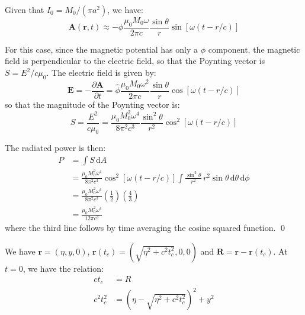 \documentclass[12pt]{article}
\begin{document}
Given that $I_{0} = M_{0}/(\pi a^{2})$, we have:
\begin{equation}
    \mathbf{A}(\mathbf{r}, t) \approx -\hat{\phi} \frac{\mu_{0} M_{0} \omega}{2\pi c} \frac{\sin{\theta}}{r} \sin{\left[ \omega (t - r/c) \right]}
\end{equation}

For this case, since the magnetic potential has only a $\phi$ component, the magnetic field is perpendicular to the electric field, so that the Poynting vector is $S = E^{2}/c\mu_{0}$. The electric field is given by:
\begin{equation}
    \mathbf{E} = -\frac{\partial \mathbf{A}}{\partial t} = \hat{\phi} \frac{\mu_{0} M_{0} \omega^{2}}{2\pi c} \frac{\sin{\theta}}{r} \cos{\left[ \omega (t - r/c) \right]}
\end{equation}
so that the magnitude of the Poynting vector is:
\begin{equation}
    S = \frac{E^{2}}{c\mu_{0}} = \frac{\mu_{0} M_{0}^{2} \omega^{4}}{8\pi^{2} c^{3}} \frac{\sin^{2}{\theta}}{r^{2}} \cos^{2}{\left[ \omega (t - r/c) \right]}
\end{equation}

The radiated power is then:
\begin{equation}
    \begin{split}
        P &= \int S \, \mathrm{d}A \\
        &= \frac{\mu_{0} M_{0}^{2} \omega^{4}}{8\pi^{2} c^{3}} \cos^{2}{\left[ \omega (t - r/c) \right]} \int \frac{\sin^{2}{\theta}}{r^{2}} \, r^{2} \sin{\theta} \, \mathrm{d}\theta \, \mathrm{d}\phi \\
        &= \frac{\mu_{0} M_{0}^{2} \omega^{4}}{8\pi^{2} c^{3}} \left( \frac{1}{2} \right) \left( \frac{4}{3} \right) \\
        &= \frac{\mu_{0} M_{0}^{2} \omega^{4}}{12\pi c^{3}}
    \end{split}
\end{equation}
where the third line follows by time averaging the cosine squared function.
\qed


We have $\mathbf{r} = (\eta, y, 0)$, $\mathbf{r}(t_{c}) = (\sqrt{\eta^{2} + c^{2} t_{c}^{2}}, 0, 0)$ and $\mathbf{R} = \mathbf{r} - \mathbf{r}(t_{c})$. At $t = 0$, we have the relation:
\begin{equation}
    \begin{split}
        c t_{c} &= R \\
        c^{2} t_{c}^{2} &= (\eta - \sqrt{\eta^{2} + c^{2} t_{c}^{2}})^{2} + y^{2} \\
    \end{split}
\end{equation}
\end{document}
